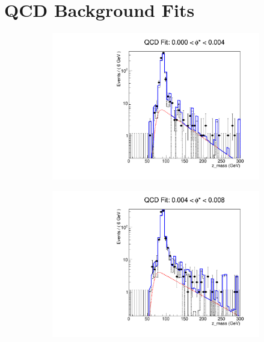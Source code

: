 \chapter{QCD Background Fits}
\label{app:qcd_fits}

\begin{figure}[!htbp]
    \centering
    \begin{subfigure}[b]{0.5\textwidth}
        \includegraphics[width=\linewidth]{figures/qcd_fits/qcd_fit_plot_for_01.pdf}
        \caption{}
        \label{fig:qcd_fit_01}
    \end{subfigure}%
    \begin{subfigure}[b]{0.5\textwidth}
        \includegraphics[width=\linewidth]{figures/qcd_fits/qcd_fit_plot_for_02.pdf}

\end{subfigure}
\end{figure}
